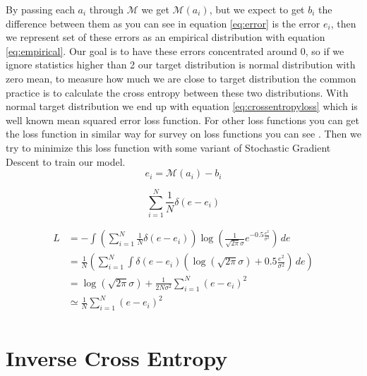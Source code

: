 \documentclass[conference]{IEEEtran}
\begin{document}
By passing each $a_i$ through $\mathcal{M}$ we get $\mathcal{M}(a_i)$, but we expect to get $b_i$ the difference between them as you can see in equation \ref{eq:error}
is the error $e_i$, then we represent set of these errors as an empirical distribution \cite{murphy2012machine} with equation \ref{eq:empirical}.
Our goal is to have these errors concentrated around 0, so if we ignore statistics higher than 2 our target distribution is normal distribution with zero mean, to measure how much
we are close to target distribution the common practice is to calculate the cross entropy between these two distributions.
With normal target distribution we end up with equation \ref{eq:crossentropyloss} which is well known mean squared error loss function.
For other loss functions you can get the loss function in similar way for survey on loss functions you can see \cite{wang2020comprehensive}.
Then we try to minimize this loss function with some variant of Stochastic Gradient Descent to train our model.
\begin{equation}
    e_i = \mathcal{M}(a_i) - b_i
    \label{eq:error}
\end{equation}

\begin{equation}
    \sum_{i = 1}^{N}\frac{1}{N}\delta(e-e_i)
    \label{eq:empirical}
\end{equation}

\begin{equation}
    \begin{split}
        L&=-\int(\sum_{i = 1}^{N}\frac{1}{N}\delta(e-e_i)) \log{(\frac{1}{\sqrt{2\pi}\sigma}e^{-0.5\frac{e^2}{\sigma^2}})}  \,de\\
        &=\frac{1}{N}(\sum_{i = 1}^{N}\int\delta(e-e_i)(\log{(\sqrt{2\pi}\sigma)}+0.5\frac{e^2}{\sigma^2})  \,de)\\
        &=\log{(\sqrt{2\pi}\sigma)}+\frac{1}{2N\sigma^2}\sum_{i = 1}^{N}(e-e_i)^2\\
        &\simeq \frac{1}{N}\sum_{i = 1}^{N}(e-e_i)^2\\
    \end{split}
    \label{eq:crossentropyloss}
\end{equation}

\section{Inverse Cross Entropy}
\end{document}
